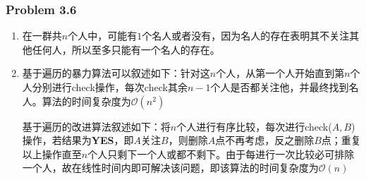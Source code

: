 \documentclass[UTF8,12pt]{article} %
\makeatletter
\theoremstyle{definition}
\newenvironment{proof}[1][\protect\proofname]{\par
\normalfont\topsep6\p@\@plus6\p@\relax
\trivlist
\itemindent\parindent
\item[\hskip\labelsep
\scshape
#1]\ignorespaces
}{%
\endtrivlist\@endpefalse
}
\renewcommand{\proofname}{\it{\textbf{证明}}}
\makeatother
\begin{document}
\subsubsection*{Problem 3.6}
\begin{proof}[\textbf{解答}]
\begin{enumerate}[1)]
	\item 在一群共$n$个人中，可能有$1$个名人或者没有，因为名人的存在表明其不关注其他任何人，所以至多只能有一个名人的存在。
	\item 基于遍历的暴力算法可以叙述如下：针对这$n$个人，从第一个人开始直到第$n$个人分别进行check操作，每次check其余$n-1$个人是否都关注他，并最终找到名人。算法的时间复杂度为$\mathcal{O}(n^{2})$

	基于遍历的改进算法叙述如下：将$n$个人进行有序比较，每次进行check($A,B$)操作，若结果为\textbf{YES}，即$A$关注$B$，则删除$A$点不再考虑，反之删除$B$点；重复以上操作直至$n$个人只剩下一个人或都不剩下。由于每进行一次比较必可排除一个人，故在线性时间内即可解决该问题，即该算法的时间复杂度为$\mathcal{O}(n)$
\end{enumerate}
\end{proof}
\end{document}
